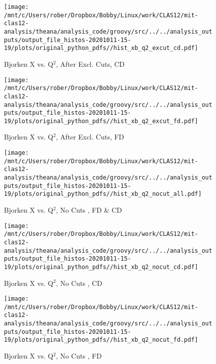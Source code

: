 \documentclass{article}
\begin{document}
\begin{landscape}
    \begin{figure}[h]
        \centering

        \texttt{[image: /mnt/c/Users/rober/Dropbox/Bobby/Linux/work/CLAS12/mit-clas12-analysis/theana/analysis\_code/groovy/src/../../analysis\_outputs/output\_file\_histos-20201011-15-19/plots/original\_python\_pdfs//hist\_xb\_q2\_excut\_cd.pdf]}
        \captionsetup{textformat=empty,labelformat=blank}
        \caption{Bjorken X vs. Q$^{2}$, After Excl. Cuts, CD}
    \end{figure}
    \clearpage
    
    \begin{figure}[h]
        \centering

        \texttt{[image: /mnt/c/Users/rober/Dropbox/Bobby/Linux/work/CLAS12/mit-clas12-analysis/theana/analysis\_code/groovy/src/../../analysis\_outputs/output\_file\_histos-20201011-15-19/plots/original\_python\_pdfs//hist\_xb\_q2\_excut\_fd.pdf]}
        \captionsetup{textformat=empty,labelformat=blank}
        \caption{Bjorken X vs. Q$^{2}$, After Excl. Cuts, FD}
    \end{figure}
    \clearpage
    
    \begin{figure}[h]
        \centering

        \texttt{[image: /mnt/c/Users/rober/Dropbox/Bobby/Linux/work/CLAS12/mit-clas12-analysis/theana/analysis\_code/groovy/src/../../analysis\_outputs/output\_file\_histos-20201011-15-19/plots/original\_python\_pdfs//hist\_xb\_q2\_nocut\_all.pdf]}
        \captionsetup{textformat=empty,labelformat=blank}
        \caption{Bjorken X vs. Q$^{2}$, No Cuts , FD \& CD}
    \end{figure}
    \clearpage
    
    \begin{figure}[h]
        \centering

        \texttt{[image: /mnt/c/Users/rober/Dropbox/Bobby/Linux/work/CLAS12/mit-clas12-analysis/theana/analysis\_code/groovy/src/../../analysis\_outputs/output\_file\_histos-20201011-15-19/plots/original\_python\_pdfs//hist\_xb\_q2\_nocut\_cd.pdf]}
        \captionsetup{textformat=empty,labelformat=blank}
        \caption{Bjorken X vs. Q$^{2}$, No Cuts , CD}
    \end{figure}
    \clearpage
    
    \begin{figure}[h]
        \centering

        \texttt{[image: /mnt/c/Users/rober/Dropbox/Bobby/Linux/work/CLAS12/mit-clas12-analysis/theana/analysis\_code/groovy/src/../../analysis\_outputs/output\_file\_histos-20201011-15-19/plots/original\_python\_pdfs//hist\_xb\_q2\_nocut\_fd.pdf]}
        \captionsetup{textformat=empty,labelformat=blank}
        \caption{Bjorken X vs. Q$^{2}$, No Cuts , FD}
    \end{figure}
    \clearpage
    

\end{landscape}
\end{document}
